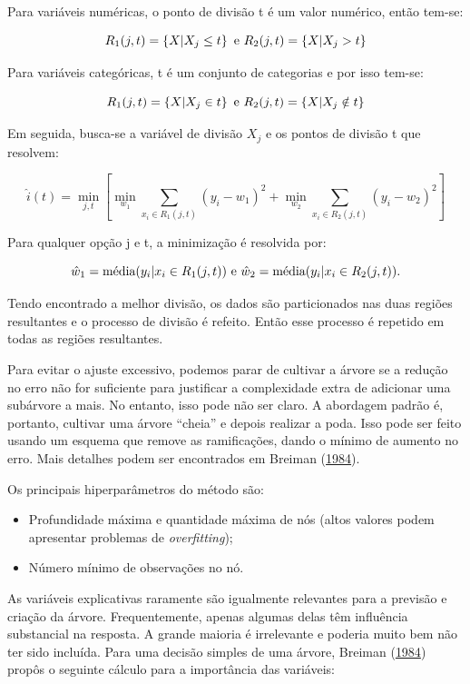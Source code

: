 \documentclass[
	12pt,				%
	a4paper,		%
	oneside,    %
	chapter=TITLE,		   %
	section=TITLE,		   %
	subsection=TITLE,	   %
	subsubsection=TITLE, %
	english,			%
	french,				%
	spanish,			%
	brazil,				%
]{abntex2}
\begin{document}
Para variáveis numéricas, o ponto de divisão t é um valor numérico,
então tem-se:

\[R_1(j,t) = \left\{ X|X_j \leq t \right\} \hbox{ e }  R_2(j,t) = \left\{X|X_j > t \right\}\]

Para variáveis categóricas, t é um conjunto de categorias e por isso
tem-se:

\[R_1(j,t) = \left\{ X|X_j \in t \right\} \hbox{ e }  R_2(j,t) = \left\{X|X_j \notin t \right\}\]

Em seguida, busca-se a variável de divisão \(X_j\) e os pontos de
divisão t que resolvem:

\[\hat{i}(t) = \underset{j,t}{\min} \left[ \underset{w_1}{\min} \sum_{x_i \in R_1 (j,t)} (y_i - w_1)^2 + \underset{w_2}{\min}  \sum_{x_i \in R_2 (j,t)} (y_i - w_2)^2   \right]\]

Para qualquer opção j e t, a minimização é resolvida por:

\[\hat{w}_1 = \hbox{média}(y_i|x_i \in R_1(j,t)) \hbox{ e } \hat{w}_2 = \hbox{média} (y_i|x_i \in R_2(j,t)).\]

Tendo encontrado a melhor divisão, os dados são particionados nas duas
regiões resultantes e o processo de divisão é refeito. Então esse
processo é repetido em todas as regiões resultantes.

Para evitar o ajuste excessivo, podemos parar de cultivar a árvore se a
redução no erro não for suficiente para justificar a complexidade extra
de adicionar uma subárvore a mais. No entanto, isso pode não ser claro.
A abordagem padrão é, portanto, cultivar uma árvore ``cheia'' e depois
realizar a poda. Isso pode ser feito usando um esquema que remove as
ramificações, dando o mínimo de aumento no erro. Mais detalhes podem ser
encontrados em Breiman (\protect\hyperlink{ref-breiman1984j}{1984}).

Os principais hiperparâmetros do método são:

\begin{itemize}
\item
  Profundidade máxima e quantidade máxima de nós (altos valores podem
  apresentar problemas de \emph{overfitting});
\item
  Número mínimo de observações no nó.
\end{itemize}

As variáveis explicativas raramente são igualmente relevantes para a
previsão e criação da árvore. Frequentemente, apenas algumas delas têm
influência substancial na resposta. A grande maioria é irrelevante e
poderia muito bem não ter sido incluída. Para uma decisão simples de uma
árvore, Breiman (\protect\hyperlink{ref-breiman1984j}{1984}) propôs o
seguinte cálculo para a importância das variáveis:
\end{document}
